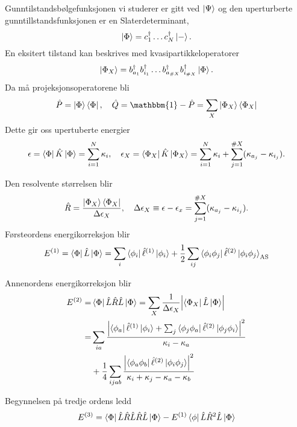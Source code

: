 \documentclass{beamer}
\begin{document}
\begin{frame}
	Gunntilstandsbølgefunksjonen vi studerer er gitt ved $\ket{\Psi}$ og den uperturberte gunntillstandsfunksjonen er en Slaterdeterminant,
	\begin{equation}
		\ket{\Phi} = c_1^\dagger \dots c^\dagger_N \ket{-}.
	\end{equation}
	En eksitert tilstand kan beskrives med kvasipartikkeloperatorer
	\begin{equation}
		\ket{\Phi_X} = b^\dagger_{a_1}b^\dagger_{i_1} \dots b^\dagger_{a_{\#X}}b^\dagger_{i_{\#X}} \ket{\Phi}.
	\end{equation}
	Da må projeksjonsoperatorene bli
	\begin{equation}
		\hat P = \ket{\Phi}\bra{\Phi}, \quad \hat Q = \mathbbm{1} - \hat P = \sum_{X}\ket{\Phi_X}\bra{\Phi_X}
	\end{equation}
	Dette gir oss upertuberte energier
	\begin{equation}
		\epsilon = \bra{\Phi}\hat K\ket{\Phi} = \sum_{i=1}^N \kappa_i, \quad \epsilon_X = \bra{\Phi_X} \hat K \ket{\Phi_X} = \sum_{i=1}^N\kappa_i + \sum_{j=1}^{\#X}(\kappa_{a_j} - \kappa_{i_j}).
	\end{equation}
\end{frame}

\begin{frame}
	Den resolvente størrelsen blir
	\begin{equation}
		\hat R = \frac{\ket{\Phi_X}\bra{\Phi_X}}{\Delta\epsilon_X}, \quad \Delta\epsilon_X \equiv \epsilon - \epsilon_x = \sum_{j=1}^{\#X}(\kappa_{a_j} - \kappa_{i_j}).
	\end{equation}
	 Førsteordens energikorreksjon blir
	 \begin{equation}
	 E^{(1)} = \bra{\Phi}\hat L \ket{\Phi} = \sum_i \bra{\phi_i} \hat \ell^{(1)}\ket{\phi_i} + \frac{1}{2}\sum_{ij}\bra{\phi_i\phi_j}\hat \ell^{(2)} \ket{\phi_i \phi_j}_{\text{AS}}
	 \end{equation}
\end{frame}

\begin{frame}
	Annenordens energikorreksjon blir
	\begin{align}
		E^{(2)} =& \bra{\Phi} \hat L \hat R \hat L \ket{\Phi} = \sum_X \frac{1}{\Delta \epsilon_X}\abs{\bra{\Phi_X} \hat L \ket{\Phi}} \\ 
	 	=&\sum_{ia}\frac{\abs{\bra{\phi_a}\hat \ell^{(1)} \ket{\phi_i} + \sum_j \bra{\phi_j\phi_a} \hat \ell^{(2)}\ket{\phi_j \phi_i}}^2}{\kappa_i - \kappa_a}  \\
	 	&+ \frac{1}{4} \sum_{ijab}\frac{\abs{\bra{\phi_a \phi_b} \hat \ell^{(2)} \ket{\phi_i \phi_j}}^2}{\kappa_i + \kappa_j - \kappa_a - \kappa_b}
	\end{align}
	
	Begynnelsen på tredje ordens ledd
	\begin{equation}
		E^{(3)} = \bra{\Phi}\hat L \hat R \hat L \hat R \hat L \ket{\Phi} - E^{(1)}\bra{\phi}\hat L \hat R^2 \hat L \ket{\Phi}
	\end{equation}
\end{frame}
\end{document}
